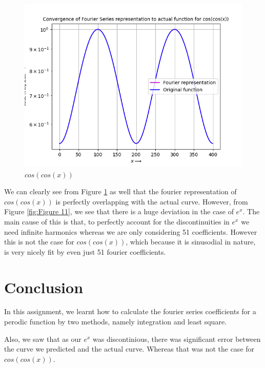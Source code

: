 \documentclass[11pt, a4paper]{article}
\begin{document}
\begin{figure}[!tbh]
    \centering
    \includegraphics[scale = 0.7]{Q7-2.png}
    \caption{$cos(cos(x))$}
    \label{fig:Figure 12}
\end{figure}
\par We can clearly see from Figure \ref{fig:Figure 12} as well that the fourier representation of $cos(cos(x))$ is perfectly overlapping with the actual curve. However, from Figure \ref{fig:Figure 11}, we see that there is a huge deviation in the case of $e^x$. The main cause of this is that, to perfectly account for the discontinuities in $e^x$ we need infinite harmonics whereas we are only considering 51 coefficients. However this is not the case for $cos(cos(x))$, which because it is sinusodial in nature, is very nicely fit by even just 51 fourier coefficients.

\section{Conclusion}
\par In this assignment, we learnt how to calculate the fourier series coefficients for a perodic function by two methods, namely integration and least square.
\par Also, we saw that as our $e^x$ was discontinious, there was significant error between the curve we predicted and the actual curve. Whereas that was not the case for $cos(cos(x))$.
\end{document}
